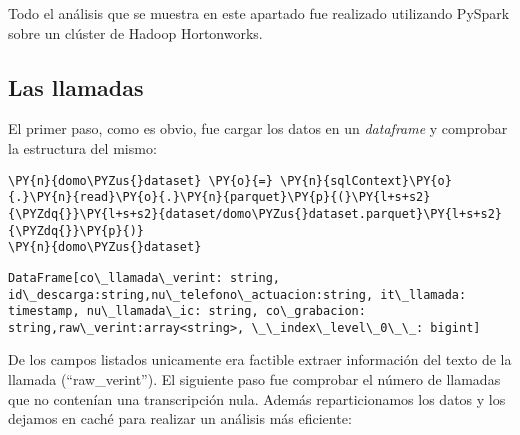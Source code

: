 Todo el análisis que se muestra en este apartado fue realizado utilizando PySpark sobre un clúster de Hadoop Hortonworks.

\subsection{Las llamadas}



El primer paso, como es obvio, fue cargar los datos en un \textit{dataframe} y comprobar la estructura del mismo: 


\vspace{0.5cm}

\begin{tcolorbox}[breakable, size=fbox, boxrule=1pt, pad at break*=1mm,colback=cellbackground, colframe=cellborder]
\begin{Verbatim}[commandchars=\\\{\}]
\PY{n}{domo\PYZus{}dataset} \PY{o}{=} \PY{n}{sqlContext}\PY{o}{.}\PY{n}{read}\PY{o}{.}\PY{n}{parquet}\PY{p}{(}\PY{l+s+s2}{\PYZdq{}}\PY{l+s+s2}{dataset/domo\PYZus{}dataset.parquet}\PY{l+s+s2}{\PYZdq{}}\PY{p}{)}
\PY{n}{domo\PYZus{}dataset}
\end{Verbatim}
\end{tcolorbox}

 \begin{tcolorbox}[breakable, size=fbox, boxrule=.5pt, pad at break*=1mm, opacityfill=0]
\begin{Verbatim}[commandchars=\\\{\}]
DataFrame[co\_llamada\_verint: string, id\_descarga:string,nu\_telefono\_actuacion:string, it\_llamada: timestamp, nu\_llamada\_ic: string, co\_grabacion: string,raw\_verint:array<string>, \_\_index\_level\_0\_\_: bigint]
\end{Verbatim}
\end{tcolorbox}


De los campos listados unicamente era factible extraer información del texto de la llamada (``raw\_verint''). El siguiente paso fue comprobar el número de llamadas que no contenían una transcripción nula. Además reparticionamos los datos y los dejamos en caché para realizar un análisis más eficiente: 

\vspace{0.5cm}


